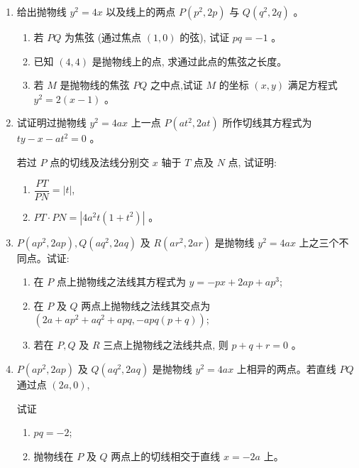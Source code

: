 \documentclass[10pt]{article}
\begin{document}
\begin{enumerate}
    \item 给出抛物线 $y^{2}=4 x$ 以及线上的两点 $P\left(p^{2}, 2 p\right)$ 与 $Q\left(q^{2}, 2 q\right)$ 。
        \begin{enumerate}
            \item 若 $PQ$ 为焦弦 (通过焦点 $(1,0)$ 的弦), 试证 $p q=-1$ 。
            \item 已知 $(4,4)$ 是抛物线上的点, 求通过此点的焦弦之长度。
            \item 若 $M$ 是抛物线的焦弦 $PQ$ 之中点,试证 $M$ 的坐标 $(x, y)$ 满足方程式 $y^{2}=2(x-1)$ 。
        \end{enumerate}

    \item 试证明过抛物线 $y^{2}=4 a x$ 上一点 $P\left(a t^{2}, 2 a t\right)$ 所作切线其方程式为 $t y-x-a t^{2}=0$ 。

    若过 $P$ 点的切线及法线分别交 $x$ 轴于 $T$ 点及 $N$ 点, 试证明:
        \begin{enumerate}
            \item $\dfrac{PT}{PN}=|t|$,
            \item $PT \cdot PN=\left|4 a^{2} t\left(1+t^{2}\right)\right|$ 。
        \end{enumerate}

    \item $P\left(a p^{2}, 2 a p\right), Q\left(a q^{2}, 2 a q\right)$ 及 $R\left(a r^{2}, 2 a r\right)$ 是抛物线 $y^{2}=4 a x$ 上之三个不同点。试证:
        \begin{enumerate}
            \item 在 $P$ 点上抛物线之法线其方程式为 $y=-p x+2 a p+a p^{3}$;
            \item 在 $P$ 及 $Q$ 两点上抛物线之法线其交点为 $\left(2 a+a p^{2}+a q^{2}+a p q,-a p q(p+q)\right)$;
            \item 若在 $P, Q$ 及 $R$ 三点上抛物线之法线共点, 则 $p+q+r=0$ 。
        \end{enumerate}

  \item $P\left(a p^{2}, 2 a p\right)$ 及 $Q\left(a q^{2}, 2 a q\right)$ 是抛物线 $y^{2}=4 a x$ 上相异的两点。若直线 $PQ$ 通过点 $(2 a, 0)$,

  试证 \begin{enumerate}
    \item $p q=-2$;

    \item 抛物线在 $P$ 及 $Q$ 两点上的切线相交于直线 $x=-2 a$ 上。
  \end{enumerate}


\end{enumerate}
\end{document}
